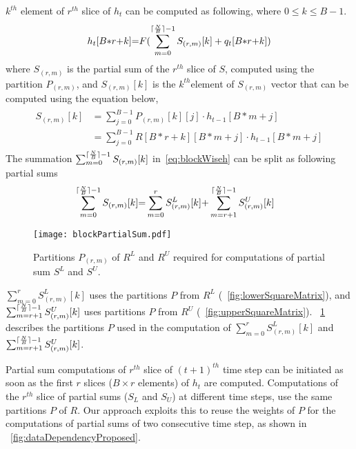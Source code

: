 $k^{th}$ element of $r^{th}$ slice of $h_{t}$ can be computed as following, where $0{\le}k{\le}B{-}1$. 
\begin{align}
	h_{t}[B{*}r{+}k]{=}F(\sum_{m{=}0}^{\lceil\frac{N}{B}\rceil{-}1}S_{(r,m)}[k]+q_{t}[B{*}r{+}k]) \label{eq:blockWiseh}
\end{align}
where $S_{(r,m)}$ is the partial sum of the $r^{th}$ slice of $S$, computed using the partition $P_{(r,m)}$, and $S_{(r,m)}[k]$ is the $k^{th}$element of $S_{(r,m)}$ vector that can be computed using the equation below,
\begin{align}	 \label{eq:blockWiseSum}
	\begin{split}
	S_{(r,m)}[k]&{=}\sum_{j=0}^{B{-}1}P_{(r,m)}[k][j]\cdot h_{t-1}[B{*}m{+}j]\\
	&{=}\sum_{j=0}^{B{-}1}R[B{*}r{+}k][B{*}m{+}j]\cdot h_{t-1}[B{*}m{+}j]
 \end{split}
\end{align}
The summation $\sum_{m{=}0}^{\lceil\frac{N}{B}\rceil{-}1}S_{(r,m)}[k]$ in~\eqref{eq:blockWiseh} can be split as following partial sums
\begin{align}
	&\sum_{m{=}0}^{\lceil\frac{N}{B}\rceil{-}1}S_{(r,m)}[k]{=}\sum_{m{=}0}^{r}S_{(r,m)}^{L}[k]{+}\sum_{m{=}r{+}1}^{\lceil\frac{N}{B}\rceil{-}1}S_{(r,m)}^{U}[k] 
\end{align}
\begin{figure}[!htb]
	\centerline{\texttt{[image: blockPartialSum.pdf]}}
	\caption{Partitions $P_{(r,m)}$ of $R^L$ and $R^U$ required for computations of partial sum $S^L$ and $S^U$.}
	\label{fig:blockPartialSum}
	\vspace{-1.0em}	
\end{figure}

$\sum_{m{=}0}^{r}S_{(r,m)}^{L}[k]$ uses the partitions $P$ from $R^L$ (\figurename{~\ref{fig:lowerSquareMatrix}}), and $\sum_{m{=}r{+}1}^{\lceil\frac{N}{B}\rceil{-}1}S_{(r,m)}^{U}[k]$ uses partitions $P$ from $R^U$ (\figurename{~\ref{fig:upperSquareMatrix}}). \figurename{~\ref{fig:blockPartialSum}} describes the partitions $P$ used in the computation of $\sum_{m{=}0}^{r}S_{(r,m)}^{L}[k]$ and $\sum_{m{=}r{+}1}^{\lceil\frac{N}{B}\rceil{-}1}S_{(r,m)}^{U}[k]$.

Partial sum computations of $r^{th}$ slice of $(t{+}1)^{th}$ time step can be initiated as soon as the first $r$ slices ($B{\times}r$ elements) of $h_t$ are computed.
Computations of the $r^{th}$ slice of partial sums ($S_L$ and $S_U$) at different time steps, use the same partitions $P$ of $R$. Our approach exploits this to reuse the weights of $P$ for the computations of partial sums of two consecutive time step, as shown in \figurename{~\ref{fig:dataDependencyProposed}}. 

